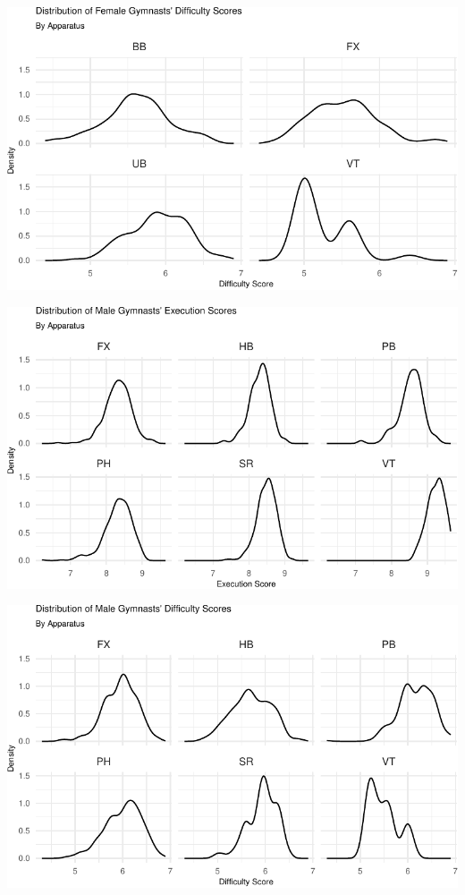 \documentclass[
  10.5pt,
  letterpaper,
  DIV=11,
  numbers=noendperiod]{scrartcl}
\begin{document}
\includegraphics{Main_files/figure-pdf/execution-difficulty-distributions-2.pdf}

\includegraphics{Main_files/figure-pdf/execution-difficulty-distributions-3.pdf}

\includegraphics{Main_files/figure-pdf/execution-difficulty-distributions-4.pdf}
\end{document}

